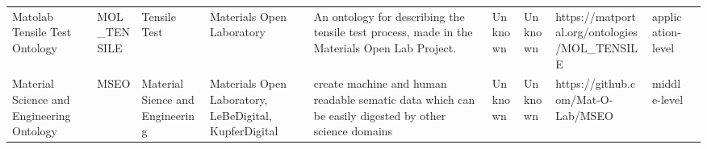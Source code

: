 \begin{tabular}{llllllllll}
                                                    Matolab Tensile Test Ontology &             MOL_TENSILE &                                Tensile Test &                                                                                                                                                                                                                                                                                                                                            Materials Open Laboratory &                                                                                                                                                                                                                                                                                                           An ontology for describing the tensile test process, made in the Materials Open Lab Project. &                                                                                                            Unknown &                                      Unknown &                                                       https://matportal.org/ontologies/MOL_TENSILE & application-level \\
                                        Material Science and Engineering Ontology &                    MSEO &             Material Sience and Engineering &                                                                                                                                                                                                                                                                                                                Materials Open Laboratory, LeBeDigital, KupferDigital &                                                                                                                                                                                                                                                                                                   create machine and human readable sematic data which can be easily digested by other science domains &                                                                                                            Unknown &                                      Unknown &                                                                  https://github.com/Mat-O-Lab/MSEO &      middle-level \\

\end{tabular}
